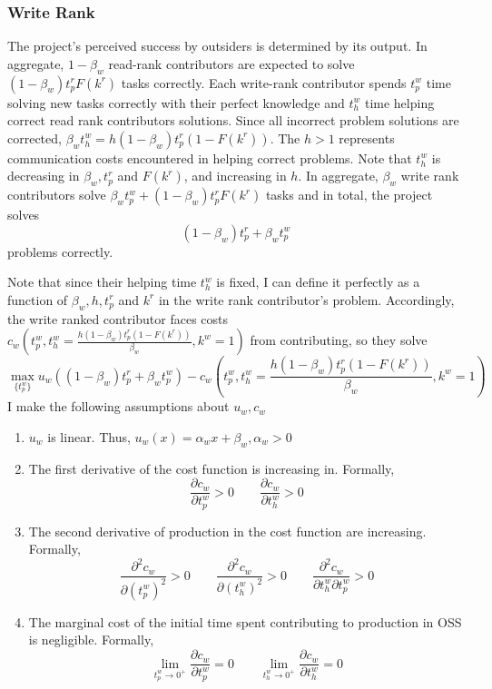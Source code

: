 \documentclass[../main.tex]{subfiles}
\begin{document}
\subsubsection{Write Rank}
The project's perceived success by outsiders is determined by its output. In aggregate, $1-\beta_w$ read-rank contributors are expected to solve $(1-\beta_w) t_p^rF(k^r)$ tasks correctly. Each write-rank contributor spends $t_p^w$ time solving new tasks correctly with their perfect knowledge and $t_h^w$ time helping correct read rank contributors solutions. Since all incorrect problem solutions are corrected, $\beta_w t_h^w = h (1-\beta_w) t_p^r(1-F(k^r))$. The $h>1$ represents communication costs encountered in helping correct problems. Note that $t_h^w$ is decreasing in $\beta_w, t_p^r$ and $F(k^r)$, and increasing in $h$. In aggregate, $\beta_w$ write rank contributors solve $\beta_w t_p^w + (1-\beta_w) t_p^rF(k^r)$ tasks and in total, the project solves
$$(1-\beta_w) t_p^r + \beta_w t_p^w $$
problems correctly.

\qquad Note that since their helping time $t_h^w$ is fixed, I can define it perfectly as a function of $\beta_w, h, t_p^r$ and $k^r$ in the write rank contributor's problem. Accordingly, the write ranked contributor faces costs $c_w\left(t_p^w, t_h^w = \frac{h (1-\beta_w) t_p^r(1-F(k^r))}{\beta_w}, k^w = 1\right)$ from contributing, so they solve
$$\max_{\{t_p^w\}} u_w\left((1-\beta_w) t_p^r + \beta_w t_p^w \right) - c_w\left(t_p^w, t_h^w = \frac{ h (1-\beta_w) t_p^r(1-F(k^r))}{\beta_w}, k^w = 1\right)$$
I make the following assumptions about $u_w, c_w$
\begin{enumerate}
    \item $u_w$ is linear. Thus, $u_w(x) = \alpha_wx + \beta_w, \alpha_w > 0$
    \item The first derivative of the cost function is increasing in. Formally, 
    $$\frac{\partial c_w}{\partial t_p^w}>0 \qquad \frac{\partial c_w}{\partial t_h^w}>0 $$   
    \item  The second derivative of production in the cost function are increasing. Formally, $$ \frac{\partial^2 c_w}{\partial (t_p^w)^2}>0 \qquad  \frac{\partial^2 c_w}{\partial (t_h^w)^2}>0 \qquad  \frac{\partial^2 c_w}{\partial t_h^w \partial t_p^w}>0$$
    \item The marginal cost of the initial time spent contributing to production in OSS is negligible. Formally,
    $$\lim_{t_p^w \to 0^+} \frac{\partial c_w}{\partial t_p^w} = 0 \qquad \lim_{t_h^w \to 0^+} \frac{\partial c_w}{\partial t_h^w} = 0$$
\end{enumerate}
\end{document}
